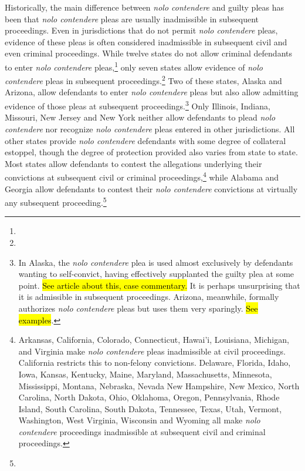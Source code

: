 Historically, the main difference between \textit{nolo contendere} and guilty pleas has been that \textit{nolo contendere} pleas are usually inadmissible in subsequent proceedings. Even in jurisdictions that do not permit \textit{nolo contendere} pleas, evidence of these pleas is often considered inadmissible in subsequent civil and even criminal proceedings. While twelve states do not allow criminal defendants to enter \textit{nolo contendere} pleas,\footnote{} only seven states allow evidence of \textit{nolo contendere} pleas in subsequent proceedings.\footnote{} Two of these states, Alaska and Arizona, allow defendants to enter \textit{nolo contendere} pleas but also allow admitting evidence of those pleas at subsequent proceedings.\footnote{In Alaska, the \textit{nolo contendere} plea is used almost exclusively by defendants wanting to self-convict, having effectively supplanted the guilty plea at some point. \hl{See article about this, case commentary.} It is perhaps unsurprising that it is admissible in subsequent proceedings. Arizona, meanwhile, formally authorizes \textit{nolo contendere} pleas but uses them very sparingly. \hl{See examples}.} Only Illinois, Indiana, Missouri, New Jersey and New York neither allow defendants to plead \textit{nolo contendere} nor recognize \textit{nolo contendere} pleas entered in other jurisdictions. All other states provide \textit{nolo contendere} defendants with some degree of collateral estoppel, though the degree of protection provided also varies from state to state. Most states allow defendants to contest the allegations underlying their convictions at subsequent civil or criminal proceedings,\footnote{Arkansas, California, Colorado, Connecticut, Hawai'i, Louisiana, Michigan, and Virginia make \textit{nolo contendere} pleas inadmissible at civil proceedings. California restricts this to non-felony convictions. Delaware, Florida, Idaho, Iowa, Kansas, Kentucky, Maine, Maryland, Massachusetts, Minnesota, Mississippi, Montana, Nebraska, Nevada New Hampshire, New Mexico, North Carolina, North Dakota, Ohio, Oklahoma, Oregon, Pennsylvania, Rhode Island, South Carolina, South Dakota, Tennessee, Texas, Utah, Vermont, Washington, West Virginia, Wisconsin and Wyoming all make \textit{nolo contendere} proceedings inadmissible at subsequent civil and criminal proceedings.} while Alabama and Georgia allow defendants to contest their \textit{nolo contendere} convictions at virtually any subsequent proceeding.\footnote{}

